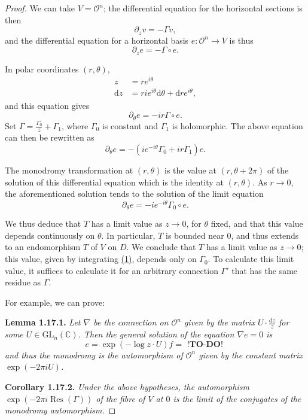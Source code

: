 \documentclass{report}
\newenvironment{itenv}[1]
  {\phantomsection\par\medskip\noindent\textbf{#1.}\itshape}
  {\par\medskip}
\renewcommand{\cal}[1]{{\mathcal{#1}}}
\newcommand{\CC}{\mathbb{C}}
\newcommand{\dd}{\mathrm{d}}
\newcommand{\GL}{\mathrm{GL}}
\DeclareMathOperator{\Res}{Res}
\newcommand{\todo}{\textbf{ !TO-DO! }}
\newcommand{\oldpage}[1]{\marginpar{\footnotesize$\Big\vert$ \textit{p.~#1}}}
\begin{document}
\begin{proof}
  We can take $V=\cal{O}^n$;
  the differential equation for the horizontal sections is then
  \[
    \partial_z v = -\Gamma v,
  \]
  and the differential equation for a horizontal basis $e\colon\cal{O}^n\to V$ is thus
  \[
  \label{II.1.17.proof.1}
    \partial_z e = -\Gamma\circ e.
  \tag{1}
  \]

  In polar coordinates $(r,\theta)$,
  \[
    \begin{aligned}
      z &= re^{i\theta}
    \\\dd z &= rie^{i\theta}\dd\theta+\dd re^{i\theta},
    \end{aligned}
  \]
  and this equation gives
\oldpage{54}
  \[
    \partial_\theta e = -ir\Gamma\circ e.
  \]
  Set $\Gamma=\frac{\Gamma_0}{z}+\Gamma_1$, where $\Gamma_0$ is constant and $\Gamma_1$ is holomorphic.
  The above equation can then be rewritten as
  \[
    \partial_\theta e = -(ie^{-i\theta}\Gamma_0+ir\Gamma_1)e.
  \]

  The monodromy transformation at $(r,\theta)$ is the value at $(r,\theta+2\pi)$ of the solution of this differential equation which is the identity at $(r,\theta)$.
  As $r\to0$, the aforementioned solution tends to the solution of the limit equation
  \[
  \label{II.1.17.proof.2}
    \partial_\theta e = -ie^{-i\theta}\Gamma_0\circ e.
  \tag{2}
  \]

  We thus deduce that $T$ has a limit value as $z\to0$, for $\theta$ fixed, and that this value depends continuously on $\theta$.
  In particular, $T$ is bounded near $0$, and thus extends to an endomorphism $T$ of $V$ on $D$.
  We conclude that $T$ has a limit value as $z\to0$;
  this value, given by integrating \hyperref[II.1.17.proof.1]{(1)}, depends only on $\Gamma_0$.
  To calculate this limit value, it suffices to calculate it for an arbitrary connection $\Gamma'$ that has the same residue as $\Gamma$.

  For example, we can prove:
  \begin{itenv}{Lemma 1.17.1}
  \label{II.1.17.1}
    Let $\nabla$ be the connection on $\cal{O}^n$ given by the matrix $U\cdot\frac{\dd z}{z}$ for some $U\in\GL_n(\CC)$.
    Then the general solution of the equation $\nabla e=0$ is
    \[
      e = \exp(-\log z\cdot U)f = \todo
    \]
    and thus the monodromy is the automorphism of $\cal{O}^n$ given by the constant matrix $\exp(-2\pi iU)$.
  \end{itenv}

  \begin{itenv}{Corollary 1.17.2}
  \label{II.1.17.2}
    Under the above hypotheses, the automorphism $\exp(-2\pi i\Res(\Gamma))$ of the fibre of $V$ at $0$ is the limit of the conjugates of the monodromy automorphism.
  \end{itenv}


\end{proof}
\end{document}

